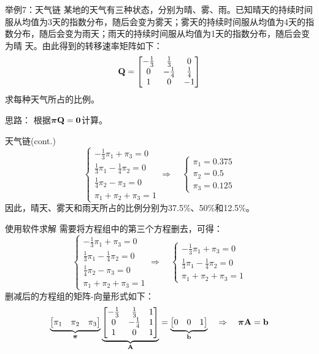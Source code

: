 \documentclass[t]{beamer}
\begin{document}
\begin{frame}{举例7：天气链}
  某地的天气有三种状态，分别为晴、雾、雨。已知晴天的持续时间服从均值为3天的指数分布，随后会变为雾天；雾天的持续时间服从均值为4天的指数分布，随后会变为雨天；雨天的持续时间服从均值为1天的指数分布，随后会变为晴
  天。由此得到的转移速率矩阵如下：
  \[{\bf Q}=  \begin{bmatrix}
  -\frac{1}{3}&\frac{1}{3}&0\\
  0&-\frac{1}{4}&\frac{1}{4}\\
  1 &0&-1
  \end{bmatrix} \]
  求每种天气所占的比例。

  \begin{block}{思路：}
    根据$\bm{\pi}{\bf Q}={\bf 0}$计算。
  \end{block}
\end{frame}

\begin{frame}{天气链(cont.)}
  \[\begin{cases}
    -\frac{1}{3}\pi_1+\pi_3=0\\ 
   \frac{1}{3}\pi_1-\frac{1}{4}\pi_2=0\\ 
   {\frac{1}{4}\pi_2-\pi_3=0}\\
   \pi_1+\pi_2+\pi_3=1
   \end{cases} \Rightarrow\quad \begin{cases}
   \pi_1=0.375\\
   \pi_2=0.5\\
   \pi_3=0.125
   \end{cases} \]
   因此，晴天、雾天和雨天所占的比例分别为37.5\%、50\%和12.5\%。
\end{frame}


\begin{frame}{使用软件求解}
  需要将方程组中的第三个方程删去，可得：
  \[\begin{cases}
   -\frac{1}{3}\pi_1+\pi_3=0\\
  \frac{1}{3}\pi_1-\frac{1}{4}\pi_2=0\\ 
  {\frac{1}{4}\pi_2-\pi_3=0}\\
  \pi_1+\pi_2+\pi_3=1
  \end{cases} \Rightarrow\quad \begin{cases}
   -\frac{1}{3}\pi_1+\pi_3=0\\
  \frac{1}{3}\pi_1-\frac{1}{4}\pi_2=0\\
  \pi_1+\pi_2+\pi_3=1
  \end{cases}\]
  删减后的方程组的矩阵-向量形式如下：
  \[\underbrace{\begin{bmatrix}
    \pi_1&\pi_2&\pi_3
    \end{bmatrix}}_{\bm\pi}\underbrace{\begin{bmatrix}
  	-\frac{1}{3}&\frac{1}{3}&1\\
  	0&-\frac{1}{4}&1\\
    1 &0&1
    \end{bmatrix}}_{\bf A}=\underbrace{\begin{bmatrix}
    0&0&1
    \end{bmatrix}}_{\bf b} \quad \Rightarrow\quad  \bm{\pi}{\bf A}={\bf b} \]
  \end{frame}
\end{document}
